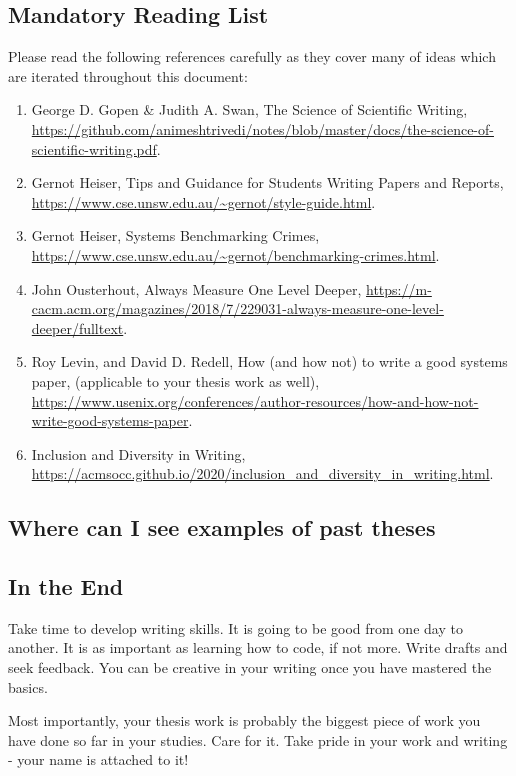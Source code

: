 \subsection*{Mandatory Reading List}
Please read the following references carefully as they cover many of ideas which are iterated throughout this document:  
\begin{enumerate}
    \item George D. Gopen \& Judith A. Swan, The Science of Scientific Writing, \url{https://github.com/animeshtrivedi/notes/blob/master/docs/the-science-of-scientific-writing.pdf}. 
    \item Gernot Heiser, Tips and Guidance for Students Writing Papers and Reports, \url{https://www.cse.unsw.edu.au/~gernot/style-guide.html}. 
    \item Gernot Heiser, Systems Benchmarking Crimes, \url{https://www.cse.unsw.edu.au/~gernot/benchmarking-crimes.html}. 
    \item John Ousterhout, Always Measure One Level Deeper, \url{https://m-cacm.acm.org/magazines/2018/7/229031-always-measure-one-level-deeper/fulltext}. 
    \item Roy Levin, and David D. Redell,  How (and how not) to write a good systems paper, (applicable to your thesis work as well), \url{https://www.usenix.org/conferences/author-resources/how-and-how-not-write-good-systems-paper}.
    \item Inclusion and Diversity in Writing, \url{https://acmsocc.github.io/2020/inclusion_and_diversity_in_writing.html}. 
\end{enumerate}

\subsection*{Where can I see examples of past theses}


\subsection*{In the End}
Take time to develop writing skills. It is going to be good from one day to another. It is as important as learning how to code, if not more. Write drafts and seek feedback. You can be creative in your writing once you have mastered the basics. 

Most importantly, your thesis work is probably the biggest piece of work you have done so far in your studies. Care for it. Take pride in your work and writing - your name is attached to it! 


